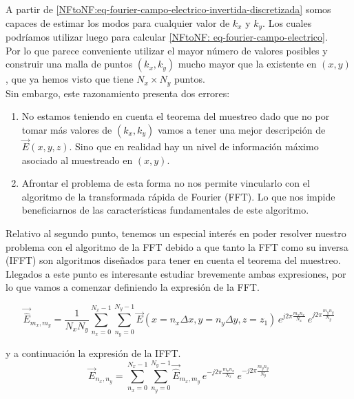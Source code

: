 \documentclass{article}
\begin{document}
\newpage

A partir de \eqref{NFtoNF:eq-fourier-campo-electrico-invertida-discretizada} somos capaces de estimar los modos para cualquier valor de $k_{x}$ y $k_{y}$. Los cuales podríamos utilizar luego para calcular  \eqref{NFtoNF: eq-fourier-campo-electrico}.\\
Por lo que parece conveniente utilizar el mayor número de valores posibles y construir
una malla de puntos $(k_{x},k_{y})$ mucho mayor que la existente en $(x,y)$, que ya hemos visto que tiene $N_{x}\times N_{y}$ puntos.
\\

Sin embargo, este razonamiento presenta dos errores:
\begin{enumerate}
    \item No estamos teniendo en cuenta el teorema del muestreo dado que no por
tomar más valores de $(k_{x},k_{y})$ vamos a tener una mejor descripción
de $\vec{E}(x,y,z)$. Sino que en realidad hay un nivel de información máximo
asociado al muestreado en $(x,y)$.
    
    \item Afrontar el problema de esta forma no nos permite vincularlo con el algoritmo de la transformada rápida de Fourier (FFT). Lo que nos impide beneficiarnos de las características fundamentales de este algoritmo.

\end{enumerate}

Relativo al segundo punto, tenemos un especial interés en poder resolver nuestro problema con el algoritmo de la FFT debido a que tanto la FFT como su inversa (IFFT) son algoritmos diseñados para tener en cuenta el teorema del muestreo.
\\

Llegados a este punto es interesante estudiar brevemente ambas expresiones, por lo que vamos a comenzar definiendo la expresión de la FFT. 

\begin{equation}
\vec{\hat{E}}_{m_{x},m_{y}}=\frac{1}{N_{x} N_{y}}
\sum_{n_{x}=0}^{N_{x}-1}\sum_{n_{y}=0}^{N_{y}-1}
\vec{E}(x=n_{x}\Delta x,y=n_{y} \Delta y,z=z_{1}) \,e^{j 2\pi
\frac{m_{x} n_{x}}{N_{x}}}\,e^{j 2\pi \frac{m_{y} n_{y}}{N_{y}}}
\label{NFtoNF:eq-fft1}
\end{equation}

y a continuación la expresión de la IFFT.
\begin{equation}
\vec{E}_{n_{x},n_{y}}=
\sum_{n_{x}=0}^{N_{x}-1}\sum_{n_{y}=0}^{N_{y}-1}
\vec{\hat{E}}_{m_{x},m_{y}} \,e^{-j 2\pi \frac{m_{x}
n_{x}}{N_{x}}}\,e^{-j 2\pi \frac{m_{y} n_{y}}{N_{y}}}
\label{NFtoNF:eq-ifft1}
\end{equation}
\end{document}
